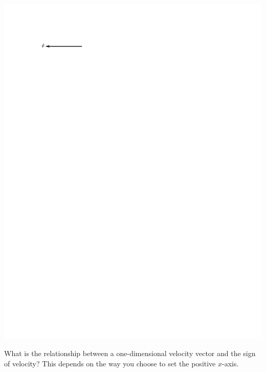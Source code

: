 \vspace{0.3cm}
{\par\centering \includegraphics{velocity/velocity_vector_2x_left.pdf} \par}
\vspace{0.3cm}

What is the relationship between a one-dimensional velocity vector and the sign
of velocity? This depends on the way you choose to set the positive $x$-axis.

